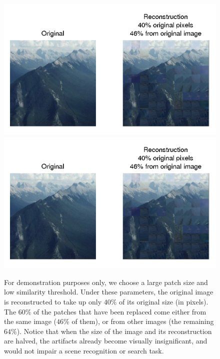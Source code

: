  \begin{figure}
\centering
\includegraphics[width=1\linewidth]{Figures/184.png}
\includegraphics[width=0.5\linewidth]{Figures/184.png}
\caption{For demonstration purposes only, we choose a large patch size and low similarity threshold. Under these parameters, the original image is reconstructed to take up only $40\%$ of its original size (in pixels). The $60\%$ of the patches that have been replaced come either from the same image ($46\%$ of them), or from other images (the remaining $64\%$). Notice that when the size of the image and its reconstruction are halved, the artifacts already become visually insignificant, and would not impair a scene recognition or search task. }
\label{fig:badrecon}
\end{figure}

